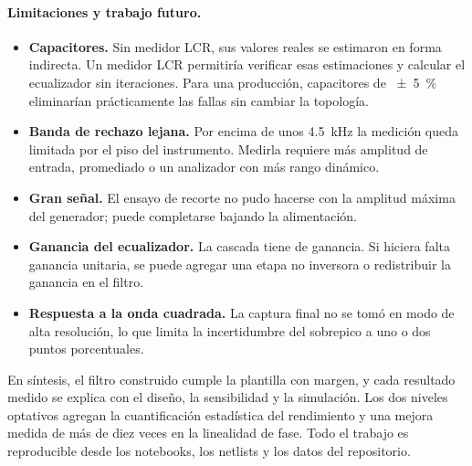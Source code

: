 \paragraph{Limitaciones y trabajo futuro.}
\begin{itemize}
  \item \textbf{Capacitores.} Sin medidor LCR, sus valores reales se estimaron en forma indirecta. Un medidor LCR permitiría verificar esas
        estimaciones y calcular el ecualizador sin iteraciones. Para una producción, capacitores de \qty{\pm 5}{\percent} eliminarían prácticamente las
        fallas sin cambiar la topología.
  \item \textbf{Banda de rechazo lejana.} Por encima de unos \qty{4.5}{\kilo\hertz} la medición queda limitada por el piso del instrumento. Medirla
        requiere más amplitud de entrada, promediado o un analizador con más rango dinámico.
  \item \textbf{Gran señal.} El ensayo de recorte no pudo hacerse con la amplitud máxima del generador; puede completarse bajando la alimentación.
  \item \textbf{Ganancia del ecualizador.} La cascada tiene  de ganancia. Si hiciera falta ganancia unitaria, se
        puede agregar una etapa no inversora o redistribuir la ganancia en el filtro.
  \item \textbf{Respuesta a la onda cuadrada.} La captura final no se tomó en modo de alta resolución, lo que limita la incertidumbre del
        sobrepico a uno o dos puntos porcentuales.
\end{itemize}

En síntesis, el filtro construido cumple la plantilla con margen, y cada resultado medido se explica con el diseño, la sensibilidad y la
simulación. Los dos niveles optativos agregan la cuantificación estadística del rendimiento y una mejora medida de más de diez veces en la
linealidad de fase. Todo el trabajo es reproducible desde los notebooks, los netlists y los datos del repositorio.
